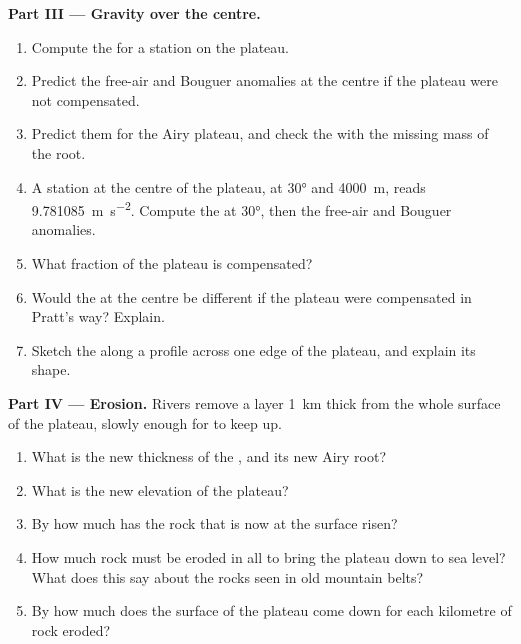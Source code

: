 \begin{problem}
\noindent\textbf{Part III --- Gravity over the centre.}
\begin{enumerate}[resume]
  \item Compute the  for a station on the plateau.
  \item Predict the free-air and Bouguer anomalies at the centre if the plateau
        were not compensated.
  \item Predict them for the Airy plateau, and check the  with
        the missing mass of the root.
  \item A station at the centre of the plateau, at  \ang{30} and
        \qty{4000}{m}, reads \qty{9.781085}{m.s^{-2}}. Compute the 
        at \ang{30}, then the free-air and Bouguer anomalies.
  \item What fraction of the plateau is compensated?
  \item Would the  at the centre be different if the plateau
        were compensated in Pratt's way? Explain.
  \item Sketch the  along a profile across one edge of the
        plateau, and explain its shape.
\end{enumerate}

\noindent\textbf{Part IV --- Erosion.}
Rivers remove a layer \qty{1}{km} thick from the whole surface of the plateau,
slowly enough for  to keep up.
\begin{enumerate}[resume]
  \item What is the new thickness of the , and its new Airy root?
  \item What is the new elevation of the plateau?
  \item By how much has the rock that is now at the surface risen?
  \item How much rock must be eroded in all to bring the plateau down to sea
        level? What does this say about the rocks seen in old mountain belts?
  \item By how much does the surface of the plateau come down for each
        kilometre of rock eroded?
\end{enumerate}
\end{problem}
